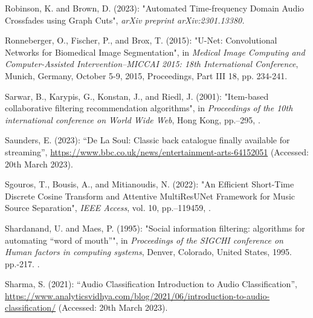 \documentclass[11pt,titlepage,oneside]{book}
\begin{document}
\begin{thebibliography}{97}
	Robinson, K. and Brown, D. (2023): "Automated {Time}-frequency {Domain}
		{Audio} {Crossfades} using {Graph} {Cuts}", \textit{arXiv preprint arXiv:2301.13380.}
	
	Ronneberger, O., Fischer, P., and Brox, T. (2015): "U-{Net}:
		{Convolutional} {Networks} for {Biomedical} {Image} {Segmentation}", in \textit{Medical Image Computing and Computer-Assisted Intervention–MICCAI 2015: 18th International Conference}, Munich, Germany, October 5-9, 2015, Proceedings, Part III 18, pp. 234-241. 
	
	Sarwar, B., Karypis, G., Konstan, J., and Riedl, J. (2001): "Item-based
		collaborative filtering recommendation algorithms", in \textit{Proceedings of
		the 10th international conference on {World} {Wide} {Web}}, Hong Kong, pp.--295, .
	
	Saunders, E. (2023): \enquote{De {La} {Soul}: {Classic} back catalogue finally
		available for streaming}, \urlprefix\url{https://www.bbc.co.uk/news/entertainment-arts-64152051} (Accessed: 20th March 2023).
	
	Sgouros, T., Bousis, A., and Mitianoudis, N. (2022): "An {Efficient}
		{Short}-{Time} {Discrete} {Cosine} {Transform} and {Attentive} {MultiResUNet}
		{Framework} for {Music} {Source} {Separation}", \textit{IEEE Access}, vol. 10,
	pp.--119459, .
	
	Shardanand, U. and Maes, P. (1995): "Social information filtering:
		algorithms for automating “word of mouth”", in \textit{Proceedings of the
		{SIGCHI} conference on {Human} factors in computing systems},
	Denver, Colorado, United States, 1995. pp.-217.
	.
	
	Sharma, S. (2021): \enquote{Audio {Classification} {\textbar} {Introduction} to
		{Audio} {Classification}},
	\urlprefix\url{https://www.analyticsvidhya.com/blog/2021/06/introduction-to-audio-classification/} (Accessed: 20th March 2023).
	

\end{thebibliography}
\end{document}
